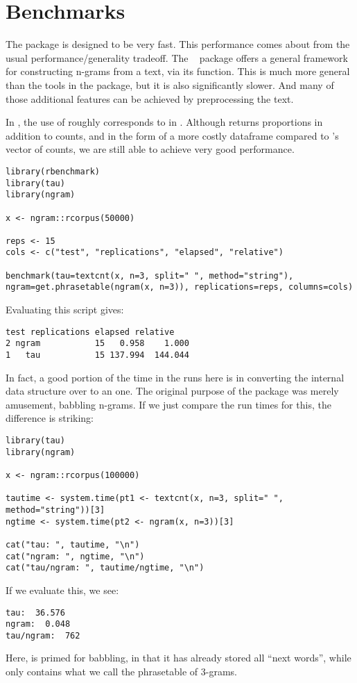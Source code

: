 \section{Benchmarks}\label{sec:benchmarks}

The  package is designed to be very fast.  This performance comes
about from the usual performance/generality tradeoff.  
The ~\citep{tau} package offers a general framework for constructing
n-grams from a text, via its  function.  This is much more
general than the tools in the  package, but it is also
significantly slower.  And many of those additional features can be achieved
by preprocessing the text.

In , the use of  roughly corresponds
to  in .  Although
 returns proportions in addition to counts, and in the
form of a more costly dataframe compared to 's vector of counts, we
are still able to achieve very good performance.
\begin{lstlisting}[language=rr]
library(rbenchmark)
library(tau)
library(ngram)

x <- ngram::rcorpus(50000)

reps <- 15
cols <- c("test", "replications", "elapsed", "relative")

benchmark(tau=textcnt(x, n=3, split=" ", method="string"), ngram=get.phrasetable(ngram(x, n=3)), replications=reps, columns=cols)
\end{lstlisting}
Evaluating this script gives:
\begin{lstlisting}[language=rout]
   test replications elapsed relative
2 ngram           15   0.958    1.000
1   tau           15 137.994  144.044
\end{lstlisting}

In fact, a good portion of the time in the  runs here is in converting the
internal  data structure over to an  one.  The original
purpose of the  package was merely amusement, babbling n-grams.
If we just compare the run times for this, the difference is striking:
\begin{lstlisting}[language=rr]
library(tau)
library(ngram)

x <- ngram::rcorpus(100000)

tautime <- system.time(pt1 <- textcnt(x, n=3, split=" ", method="string"))[3]
ngtime <- system.time(pt2 <- ngram(x, n=3))[3]

cat("tau: ", tautime, "\n")
cat("ngram: ", ngtime, "\n")
cat("tau/ngram: ", tautime/ngtime, "\n")
\end{lstlisting}
If we evaluate this, we see:
\begin{lstlisting}[language=rout]
tau:  36.576 
ngram:  0.048 
tau/ngram:  762 
\end{lstlisting}
Here,  is primed for babbling, in that it has already stored all
``next words'', while  only contains what we call the phrasetable of
3-grams.
